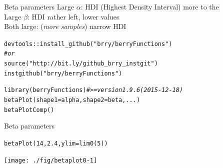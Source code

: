 \documentclass[xcolor=table,           xcolor=dvipsnames]{beamer}\usepackage[]{graphicx}\usepackage[]{color}
\makeatletter
\newcommand{\hlnum}[1]{\textcolor[rgb]{0,0,0}{#1}}
\newcommand{\hlstr}[1]{\textcolor[rgb]{0.545,0.137,0.137}{#1}}
\newcommand{\hlcom}[1]{\textcolor[rgb]{0,0.392,0}{\textit{#1}}}
\newcommand{\hlopt}[1]{\textcolor[rgb]{0,0,0}{#1}}
\newcommand{\hlstd}[1]{\textcolor[rgb]{0,0,0}{#1}}
\newcommand{\hlkwc}[1]{\textcolor[rgb]{1,0,1}{#1}}
\newcommand{\hlkwd}[1]{\textcolor[rgb]{0,0,1}{#1}}
\newenvironment{kframe}{%
 \def\at@end@of@kframe{}%
 \ifinner\ifhmode%
  \def\at@end@of@kframe{\end{minipage}}%
  \begin{minipage}{\columnwidth}%
 \fi\fi%
 \def\FrameCommand##1{\hskip\@totalleftmargin \hskip-\fboxsep
 \colorbox{shadecolor}{##1}\hskip-\fboxsep
     \hskip-\linewidth \hskip-\@totalleftmargin \hskip\columnwidth}%
 \MakeFramed {\advance\hsize-\width
   \@totalleftmargin\z@ \linewidth\hsize
   \@setminipage}}%
 {\par\unskip\endMakeFramed%
 \at@end@of@kframe}
\newenvironment{knitrout}{}{} %
\makeatother
\begin{document}
\begin{frame}[fragile]{Beta parameters}
\pause
Large $\alpha$: HDI (Highest Density Interval) more to the \\
\onslide<+-> Large $\beta$: HDI rather left, lower values\\
\onslide<+-> Both large: \onslide<+-> (\textit{more samples}) \onslide<+-> narrow HDI\\
\vspace{1.5em}
\onslide<+->
\begin{knitrout}
\color{fgcolor}\begin{kframe}
\begin{alltt}
\hlstd{devtools}\hlopt{::}\hlkwd{install_github}\hlstd{(}\hlstr{"brry/berryFunctions"}\hlstd{)}
\hlcom{# or}
\hlkwd{source}\hlstd{(}\hlstr{"http://bit.ly/github_brry_instgit"}\hlstd{)}
\hlkwd{instgithub}\hlstd{(}\hlstr{"brry/berryFunctions"}\hlstd{)}
\end{alltt}
\end{kframe}
\end{knitrout}
\onslide<+->
\begin{knitrout}
\color{fgcolor}\begin{kframe}
\begin{alltt}
\hlkwd{library}\hlstd{(berryFunctions)} \hlcom{# >= version 1.9.6 (2015-12-18)}
\hlkwd{betaPlot}\hlstd{(}\hlkwc{shape1}\hlstd{=alpha,} \hlkwc{shape2}\hlstd{=beta, ...)}
\hlkwd{betaPlotComp}\hlstd{()}
\end{alltt}
\end{kframe}
\end{knitrout}
\end{frame}


\begin{frame}[fragile]{Beta parameters}
\begin{knitrout}
\color{fgcolor}\begin{kframe}
\begin{alltt}
\hlkwd{betaPlot}\hlstd{(}\hlnum{14}\hlstd{,} \hlnum{2.4}\hlstd{,} \hlkwc{ylim}\hlstd{=}\hlkwd{lim0}\hlstd{(}\hlnum{5}\hlstd{))}
\end{alltt}
\end{kframe}

{\centering \texttt{[image: ./fig/betaplot0-1]} 

}



\end{knitrout}
\end{frame}
\end{document}
